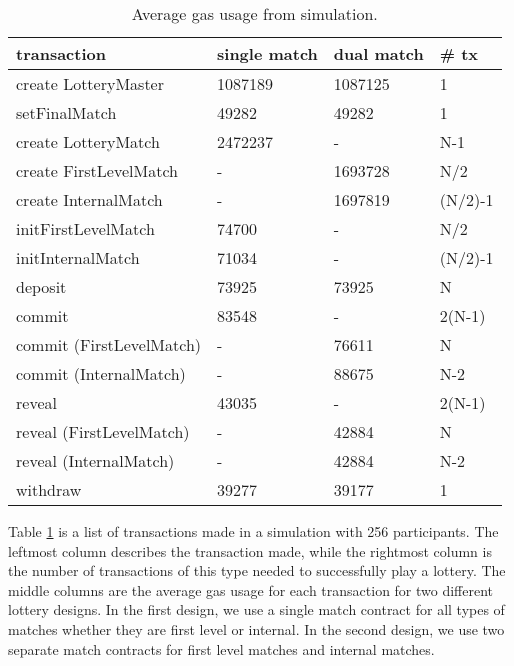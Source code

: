 \begin{table}[h]
\centering
\caption{Average gas usage from simulation.}
\label{tab:gas-usage}
\begin{tabular}{|l|l|l|l|}
\hline

transaction & single match & dual match & \# tx \\ \hline
create LotteryMaster & 1087189 & 1087125 & 1 \\ \hline
setFinalMatch & 49282 & 49282 & 1 \\ \hline
create LotteryMatch & 2472237 & - & N-1 \\ \hline
create FirstLevelMatch & - & 1693728 & N/2 \\ \hline
create InternalMatch & - & 1697819 & (N/2)-1 \\ \hline
initFirstLevelMatch & 74700 & - & N/2 \\ \hline
initInternalMatch & 71034 & - & (N/2)-1 \\ \hline
deposit & 73925 & 73925 & N \\ \hline
commit & 83548 & - & 2(N-1) \\ \hline
commit (FirstLevelMatch) & - & 76611 & N \\ \hline
commit (InternalMatch) & - & 88675 & N-2 \\ \hline
reveal & 43035 & - & 2(N-1) \\ \hline
reveal (FirstLevelMatch) & - & 42884 & N \\ \hline
reveal (InternalMatch) & - & 42884 & N-2 \\ \hline
withdraw & 39277 & 39177 & 1 \\ \hline


\end{tabular}
\end{table}

\noindent
Table \ref{tab:gas-usage} is a list of transactions made in a simulation with 256 participants. The leftmost column describes the transaction made, while the rightmost column is the number of transactions of this type needed to successfully play a lottery. The middle columns are the average gas usage for each transaction for two different lottery designs. In the first design, we use a single match contract for all types of matches whether they are first level or internal. In the second design, we use two separate match contracts for first level matches and internal matches. 

